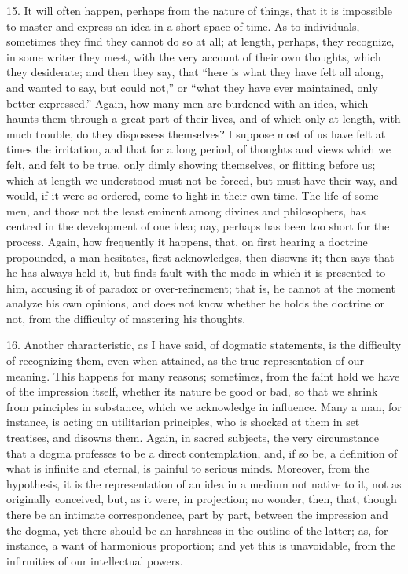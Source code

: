 15. It will often happen, perhaps from the nature of things, that
it is impossible to master and express an idea in a short space of
time. As to individuals, sometimes they find they cannot do so at all;
at length, perhaps, they recognize, in some writer they meet, with the
very account of their own thoughts, which they desiderate; and then
they say, that ``here is what they have felt all along, and wanted
to say, but could not,'' or ``what they have ever maintained,
only better expressed.'' Again, how many men are burdened with an
idea, which haunts them through a great part of their lives, and of
which only at length, with much trouble, do they dispossess
themselves? I suppose most of us have felt at times the irritation,
and that for a long period, of thoughts and views which we felt, and
felt to be true, only dimly showing themselves, or flitting before us;
which at length we understood must not be forced, but must have their
way, and would, if it were so ordered, come to light in their own
time. The life of some men, and those not the least eminent among
divines and philosophers, has centred in the development of one idea;
nay, perhaps has been too short for the process. Again, how frequently
it happens, that, on first hearing a doctrine propounded, a man
hesitates, first acknowledges, then disowns it; then says that he has
always held it, but finds fault with the mode in which it is presented
to him, accusing it of paradox or over-refinement; that is, he cannot
at the moment analyze his own opinions, and does not know whether he
holds the doctrine or not, from the difficulty of mastering his
thoughts.

16. Another characteristic, as I have said, of dogmatic statements,
is the difficulty of recognizing them, even when attained, as the true
representation of our meaning. This happens for many reasons;
sometimes, from the faint hold we have of the impression itself,
whether its nature be good or bad, so that we shrink from principles
in substance, which we acknowledge in influence. Many a man, for
instance, is acting on utilitarian principles, who is shocked at them
in set treatises, and disowns them. Again, in sacred subjects, the
very circumstance that a dogma professes to be a direct contemplation,
and, if so be, a definition of what is infinite and eternal, is
painful to serious minds. Moreover, from the hypothesis, it is the
representation of an idea in a medium not native to it, not as
originally conceived, but, as it were, in projection; no wonder, then,
that, though there be an intimate correspondence, part by part,
between the impression and the dogma, yet there should be an harshness
in the outline of the latter; as, for instance, a want of harmonious
proportion; and yet this is unavoidable, from the infirmities of our
intellectual powers.

